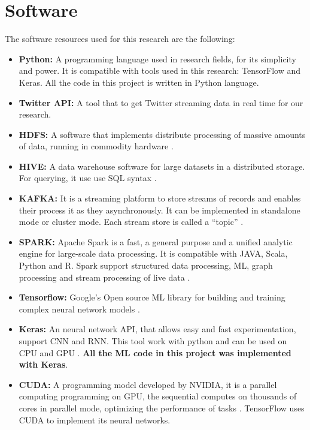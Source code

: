 \documentclass[12pt]{report}
\begin{document}
\section{Software}
The software resources used for this research are the following: 
\begin{itemize}[nolistsep]
	\item \textbf{Python:} A programming language  used in research fields, for its simplicity and power. It is compatible with tools used in this research: TensorFlow and Keras. All the code in this project is written in Python language.
	
	\item \textbf{Twitter \ac{API}:} A tool that to  get Twitter streaming data in real time for our research. 
	
	\item \textbf{\ac{HDFS}:} A software that implements  distribute processing of  massive amounts of data, running in commodity hardware \cite{Hadoop2019}.
	
	\item \textbf{HIVE:} A data warehouse software for large datasets in a distributed storage. For querying, it use use \ac{SQL} syntax \cite{Hive2019}.
	
	\item \textbf{KAFKA:} It is a streaming platform to store streams of records and enables their process it as they asynchronously. It can be implemented in standalone mode or cluster mode. Each stream store is called a ``topic'' \cite{Kafka2019}.
	
	\item \textbf{SPARK:} Apache Spark is a fast, a general purpose and a unified analytic engine for large-scale data processing. It is compatible with JAVA, Scala, Python and R. Spark support structured data processing, \ac{ML}, graph processing and stream processing of live data \cite{Spark2019}.
	
	\item \textbf{Tensorflow:} Google's Open source \ac{ML} library for building and training complex neural network models \cite{Tensor2019}.
	
	\item \textbf{Keras:} An neural network \ac{API}, that allows easy and fast experimentation, support \ac{CNN} and \ac{RNN}. This tool work with python and can be used on \ac{CPU} and \ac{GPU} \cite{Keras2019}. {\bf All the \ac{ML} code in this project was implemented with Keras}.
	
	\item \textbf{\ac{CUDA}:} A programming model developed by NVIDIA, it is a parallel computing programming on \ac{GPU}, the sequential computes on thousands of cores in parallel mode, optimizing the performance of tasks \cite{Cuda2019}. TensorFlow uses CUDA to implement its neural networks. 
	

\end{itemize}
\end{document}
